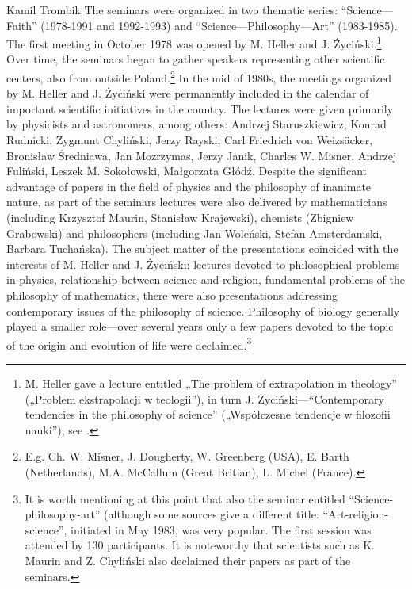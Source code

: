 \begin{artengenv}{Kamil Trombik}
The seminars were organized in two thematic series: ``Science---Faith'' (1978-1991 and 1992-1993) and
``Science---Philosophy---Art'' (1983-1985). The first meeting in October 1978 was opened by M. Heller and J.
Życiński.\footnote{M. Heller gave a lecture entitled „The problem of extrapolation in theology'' („Problem
ekstrapolacji w teologii''), in turn J. Życiński---``Contemporary tendencies in the philosophy of science'' („Współczesne
tendencje w filozofii nauki''), see
\parencite[p.133]{liana_z_1999}.
} Over time, the seminars
began to gather speakers representing other scientific centers, also from outside Poland.\footnote{E.g. Ch. W. Misner,
J. Dougherty, W. Greenberg (USA), E. Barth (Netherlands), M.A. McCallum (Great Britian), L. Michel (France).} In the
mid of 1980s, the meetings organized by M. Heller and J. Życiński were permanently included in the calendar of
important scientific initiatives in the country. The lectures were given primarily by physicists and astronomers, among
others: Andrzej Staruszkiewicz, Konrad Rudnicki, Zygmunt Chyliński, Jerzy Rayski, Carl Friedrich von
Weizsäcker, Bronisław Średniawa, Jan Mozrzymas,
Jerzy Janik, Charles W. Misner, Andrzej Fuliński, Leszek M. Sokołowski, Małgorzata Głódź. Despite the significant
advantage of papers in the field of physics and the philosophy of inanimate nature, as part of the seminars lectures
were also delivered by mathematicians (including Krzysztof Maurin, Stanisław Krajewski), chemists (Zbigniew Grabowski)
and philosophers (including Jan Woleński, Stefan Amsterdamski, Barbara Tuchańska). The subject matter of the
presentations coincided with the interests of M. Heller and J. Życiński: lectures devoted to philosophical problems in
physics, relationship between science and religion, fundamental problems of the philosophy of mathematics, there were
also presentations addressing contemporary issues of the philosophy of science. Philosophy of biology generally played
a smaller role---over several years only a few papers devoted to the topic of the origin and evolution of life were
declaimed.\footnote{It is worth mentioning at this point that also the seminar entitled ``Science-philosophy-art''
(although some sources give a different title: ``Art-religion-science'', initiated in May 1983, was very popular. The
first session was attended by 130 participants. It is noteworthy that scientists such as K. Maurin and Z. Chyliński
also declaimed their papers as part of the seminars. }


\end{artengenv}
